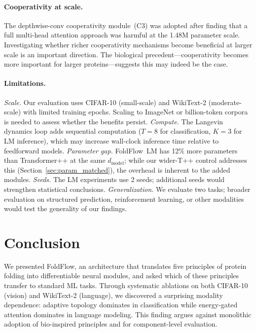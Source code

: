 \documentclass[10pt]{article}
\begin{document}
\paragraph{Cooperativity at scale.}
The depthwise-conv cooperativity module~(C3) was adopted after finding
that a full multi-head attention approach was harmful at the 1.48M
parameter scale.  Investigating whether richer cooperativity mechanisms
become beneficial at larger scale is an important direction.  The
biological precedent---cooperativity becomes more important for larger
proteins---suggests this may indeed be the case.

\paragraph{Limitations.}
\emph{Scale.}  Our evaluation uses CIFAR-10 (small-scale) and WikiText-2
(moderate-scale) with limited training epochs.  Scaling to ImageNet or
billion-token corpora is needed to assess whether the benefits persist.
\emph{Compute.}  The Langevin dynamics loop adds sequential computation
($T{=}8$ for classification, $K{=}3$ for LM inference), which may
increase wall-clock inference time relative to feedforward models.
\emph{Parameter gap.}  FoldFlow~LM has 12\% more parameters than
Transformer++ at the same $d_\text{model}$; while our wider-T++ control
addresses this (Section~\ref{sec:param_matched}), the overhead
is inherent to the added modules.
\emph{Seeds.}  The LM experiments use 2 seeds; additional seeds would
strengthen statistical conclusions.
\emph{Generalization.}  We evaluate two tasks; broader evaluation on
structured prediction, reinforcement learning, or other modalities
would test the generality of our findings.

\section{Conclusion}
\label{sec:conclusion}

We presented FoldFlow, an architecture that translates five principles
of protein folding into differentiable neural modules, and asked which
of these principles transfer to standard ML tasks.  Through systematic
ablations on both CIFAR-10 (vision) and WikiText-2 (language), we
discovered a surprising modality dependence: adaptive topology dominates
in classification while energy-gated attention dominates in language
modeling.  This finding argues against monolithic adoption of
bio-inspired principles and for component-level evaluation.
\end{document}
